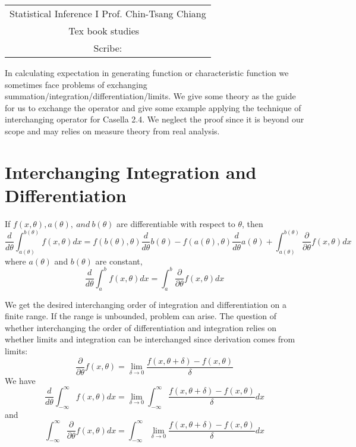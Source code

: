 \documentclass[../Transformation.tex]{subfiles}
\begin{document}
	\begin{center}
		\renewcommand{\arraystretch}{2}
		\begin{bfseries}
			\begin{tabular}{|c|}
				\hline
				Statistical Inference I \hfill Prof. Chin-Tsang Chiang\\
				\hspace{15em} {\large Tex book studies} \hspace{15em}\ \\
				\lecdate \hfill Scribe: \scribe\\
				\hline
			\end{tabular}
			\renewcommand{\arraystretch}{1}
		\end{bfseries}
	\end{center}



In calculating expectation in generating function or characteristic function we sometimes face problems of exchanging summation/integration/differentiation/limits. We give some theory as the guide for us to exchange the operator and give some example applying the technique of interchanging operator for Casella 2.4. We neglect the proof since it is beyond our scope and may relies on measure theory from real analysis.
\section{Interchanging Integration and Differentiation}
\begin{theorem}If $f(x,\theta),a(\theta),\ and\ b(\theta)$ are differentiable with respect to $\theta$, then
$$\frac{d}{d\theta}\int_{a(\theta)}^{b(\theta)}f(x,\theta)dx=f(b(\theta),\theta)\frac{d}{d\theta}b(\theta)-f(a(\theta),\theta)\frac{d}{d\theta}a(\theta)+\int_{a(\theta)}^{b(\theta)}\frac{\partial}{\partial\theta}f(x,\theta)dx$$
where $a(\theta)$ and $b(\theta)$ are constant,
$$\frac{d}{d\theta}\int_a^bf(x,\theta)dx=\int_a^b\frac{\partial}{\partial\theta}f(x,\theta)dx$$
\end{theorem}
We get the desired interchanging order of integration and differentiation on a finite range. If the range is unbounded, problem can arise. The question of whether interchanging the order of differentiation and integration relies on whether limits and integration can be interchanged since derivation comes from limits:
$$\frac{\partial}{\partial\theta}f(x,\theta)=\lim_{\delta\rightarrow0}\frac{f(x,\theta+\delta)-f(x,\theta)}{\delta}$$ We have
$$\frac{d}{d\theta}\int_{-\infty}^{\infty}f(x,\theta)dx=\lim_{\delta\rightarrow0}\int_{-\infty}^{\infty}\frac{f(x,\theta+\delta)-f(x,\theta)}{\delta}dx$$
and $$\int_{-\infty}^{\infty}\frac{\partial}{\partial\theta}f(x,\theta)dx=\int_{-\infty}^{\infty}\lim_{\delta\rightarrow0}\frac{f(x,\theta+\delta)-f(x,\theta)}{\delta}dx$$
\end{document}
